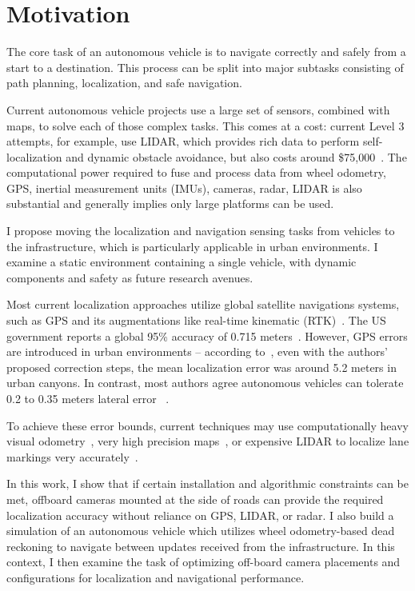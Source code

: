 \documentclass[a4paper,12pt,twoside,openright]{report}
\begin{document}
\section{Motivation}
\label{sec:intro:motivation}

The core task of an autonomous vehicle is to navigate correctly and safely from a start
to a destination. This process can be split into major subtasks consisting
of path planning, localization, and safe navigation.

Current autonomous vehicle projects use a large set of sensors, combined with
maps, to solve each of those complex tasks. This comes at a cost: current
Level 3 attempts, for example, use LIDAR, which 
provides rich data to perform self-localization and dynamic obstacle avoidance,
but also costs around \$75,000~\cite{lin2018architectural}. The computational
power required to fuse and process data from wheel odometry,
GPS, inertial measurement units (IMUs), cameras, radar, LIDAR is also substantial
and generally implies only large platforms can be used.

I propose moving the localization and navigation sensing tasks
from vehicles to the infrastructure, which is particularly applicable in urban environments.
I examine a static environment containing a single vehicle, with dynamic components and safety
as future research avenues.

Most current localization approaches utilize global satellite navigations systems,
such as GPS and its augmentations like real-time kinematic (RTK)~\cite{scherzinger2000precise}.
The US government reports a global 95\% accuracy of 0.715 meters~\cite{USGPSPerformance}. 
However, GPS errors are introduced in urban environments -- according to~\citeauthor{miura2015gps}, even with the
authors' proposed correction steps, the mean localization error was around 5.2 meters in urban canyons. 
In contrast, most authors agree autonomous vehicles can tolerate 0.2 to 0.35 meters lateral error
~\cite{vivacqua2017low}\cite{ziegler2014video}\cite{mattern2010high}.

To achieve these error bounds, current techniques may use computationally heavy visual odometry~\cite{ziegler2014video},
very high precision maps~\cite{mattern2010high}, or expensive LIDAR to localize
lane markings very accurately~\cite{hata2014road}.  

In this work, I show that if certain installation and algorithmic constraints
can be met, offboard cameras mounted at the side of roads can provide the required localization
accuracy without reliance on GPS, LIDAR, or radar. I also build a simulation
of an autonomous vehicle which utilizes wheel odometry-based dead reckoning 
to navigate between updates received from the infrastructure. In this context,
I then examine the task of optimizing off-board camera placements and configurations for localization and navigational performance.
\end{document}

